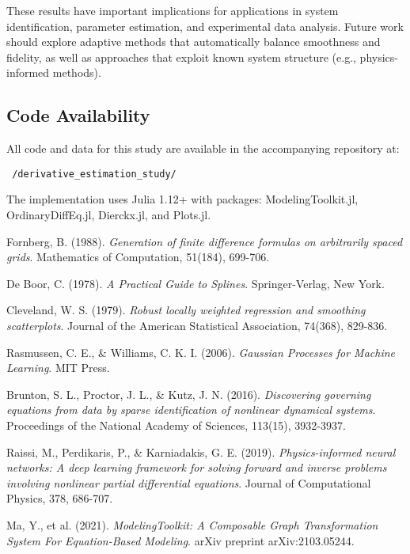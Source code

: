 \documentclass[11pt,a4paper]{article}
\begin{document}
These results have important implications for applications in system identification, parameter estimation, and experimental data analysis. Future work should explore adaptive methods that automatically balance smoothness and fidelity, as well as approaches that exploit known system structure (e.g., physics-informed methods).

\subsection{Code Availability}

All code and data for this study are available in the accompanying repository at:
\begin{center}
\texttt{~/derivative\_estimation\_study/}
\end{center}

The implementation uses Julia 1.12+ with packages: ModelingToolkit.jl, OrdinaryDiffEq.jl, Dierckx.jl, and Plots.jl.

\begin{thebibliography}{9}

Fornberg, B. (1988).
\textit{Generation of finite difference formulas on arbitrarily spaced grids}.
Mathematics of Computation, 51(184), 699-706.

De Boor, C. (1978).
\textit{A Practical Guide to Splines}.
Springer-Verlag, New York.

Cleveland, W. S. (1979).
\textit{Robust locally weighted regression and smoothing scatterplots}.
Journal of the American Statistical Association, 74(368), 829-836.

Rasmussen, C. E., \& Williams, C. K. I. (2006).
\textit{Gaussian Processes for Machine Learning}.
MIT Press.

Brunton, S. L., Proctor, J. L., \& Kutz, J. N. (2016).
\textit{Discovering governing equations from data by sparse identification of nonlinear dynamical systems}.
Proceedings of the National Academy of Sciences, 113(15), 3932-3937.

Raissi, M., Perdikaris, P., \& Karniadakis, G. E. (2019).
\textit{Physics-informed neural networks: A deep learning framework for solving forward and inverse problems involving nonlinear partial differential equations}.
Journal of Computational Physics, 378, 686-707.

Ma, Y., et al. (2021).
\textit{ModelingToolkit: A Composable Graph Transformation System For Equation-Based Modeling}.
arXiv preprint arXiv:2103.05244.

\end{thebibliography}
\end{document}
